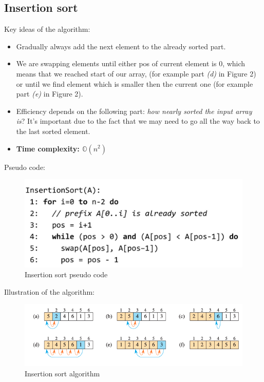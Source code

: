 \documentclass[a4paper,
  twoside, %
  headlines=2.1 %
  ]{scrartcl}
\begin{document}
    \clearpage
    \subsection*{Insertion sort}

    Key ideas of the algorithm:
    \begin{itemize}
        \item Gradually always add the next element to the already sorted part.
        
        \item We are swapping elements until either pos of current element is 0, which means that we reached start of our array, (for example part \textit{(d)} in Figure 2) or until we find element which is smaller then the current one (for example part \textit{(e)} in Figure 2).

        \item Efficiency depends on the following part: \textit{how nearly sorted the input array is}? It's important due to the fact that we may need to go all the way back to the last sorted element.

        \item \textbf{Time complexity: $\mathbb{O}(n^{2})$}
    \end{itemize}
    Pseudo code:
    \begin{figure}[H]
        \centering
        \includegraphics[width=0.5\linewidth]{insertion_sort_pseudocode.png}
        \caption{Insertion sort pseudo code}
        \label{fig:enter-label}
    \end{figure}
    Illustration of the algorithm:
    \begin{figure}[H]
        \centering
        \includegraphics[width=0.7\linewidth]{insertion_sort_algo.png}
        \caption{Insertion sort algorithm}
        \label{fig:enter-label}
    \end{figure}


    












    
\end{document}
